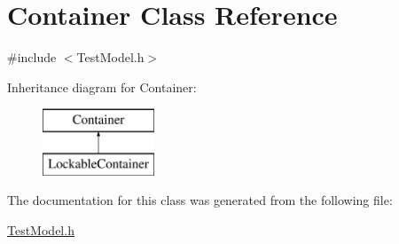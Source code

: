 \hypertarget{classContainer}{}\section{Container Class Reference}
\label{classContainer}


{\ttfamily \#include $<$Test\+Model.\+h$>$}

Inheritance diagram for Container\+:\begin{figure}[H]
\begin{center}
\leavevmode
\includegraphics[height=2.000000cm]{classContainer}
\end{center}
\end{figure}


The documentation for this class was generated from the following file\+:\begin{DoxyCompactItemize}
\item 
\hyperlink{TestModel_8h}{Test\+Model.\+h}\end{DoxyCompactItemize}
